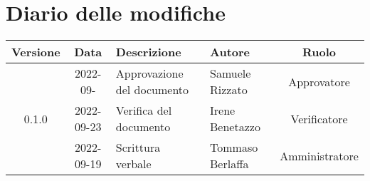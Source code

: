 \section*{Diario delle modifiche}
	\begin{center}
	\renewcommand{\arraystretch}{1.8} %
	\begin{tabular}{ |c|c|m{12em}|m{7em}|c| }
	\hline
	\textbf{Versione} & \textbf{Data} & \textbf{Descrizione} &  \textbf{Autore} &  \textbf{Ruolo} \\ %
	\hline
	& 2022-09- & Approvazione del documento & Samuele \newline Rizzato & Approvatore\\
	\hline
	0.1.0 & 2022-09-23 & Verifica del documento &  Irene \newline Benetazzo  & Verificatore\\
	\hline
  & 2022-09-19 & Scrittura verbale & Tommaso \newline Berlaffa & Amministratore\\ %
	\hline
	\end{tabular}
	\end{center}
	\newpage